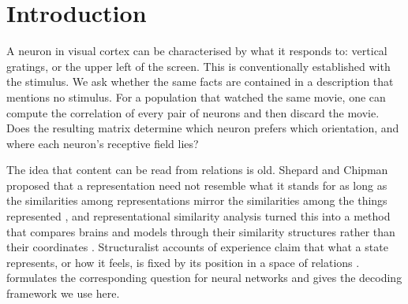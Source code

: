 \documentclass[11pt]{article}
\begin{document}
\section{Introduction}

A neuron in visual cortex can be characterised by what it responds to: vertical gratings, or the upper left of the screen. This is conventionally established with the stimulus. We ask whether the same facts are contained in a description that mentions no stimulus. For a population that watched the same movie, one can compute the correlation of every pair of neurons and then discard the movie. Does the resulting matrix determine which neuron prefers which orientation, and where each neuron's receptive field lies?

The idea that content can be read from relations is old. Shepard and Chipman proposed that a representation need not resemble what it stands for as long as the similarities among representations mirror the similarities among the things represented \citep{shepard1970}, and representational similarity analysis turned this into a method that compares brains and models through their similarity structures rather than their coordinates \citep{kriegeskorte2008}. Structuralist accounts of experience claim that what a state represents, or how it feels, is fixed by its position in a space of relations \citep{lyre2022}. \citet{framework2025} formulates the corresponding question for neural networks and gives the decoding framework we use here.
\end{document}
